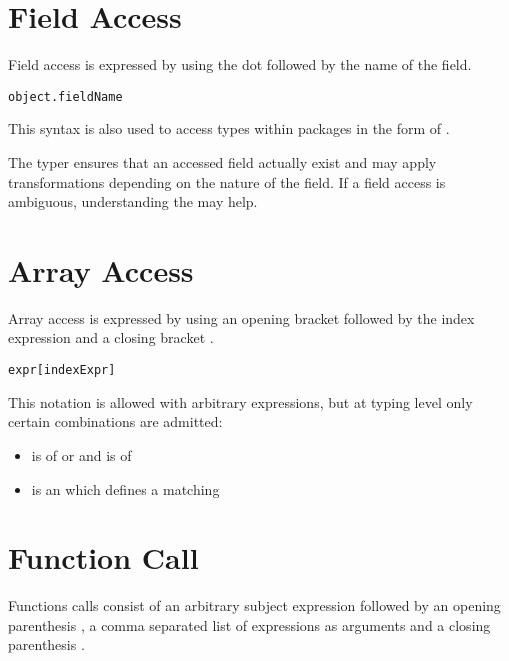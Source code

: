 \section{Field Access}
\label{expression-field-access}

Field access is expressed by using the dot  followed by the name of the field.

\begin{lstlisting}
object.fieldName
\end{lstlisting}

This syntax is also used to access types within packages in the form of .

The typer ensures that an accessed field actually exist and may apply transformations depending on the nature of the field. If a field access is ambiguous, understanding the  may help.


\section{Array Access}
\label{expression-array-access}

Array access is expressed by using an opening bracket \expr{[} followed by the index expression and a closing bracket \expr{]}.

\begin{lstlisting}
expr[indexExpr]
\end{lstlisting}

This notation is allowed with arbitrary expressions, but at typing level only certain combinations are admitted:

\begin{itemize}
	\item {} is of  or  and  is of 
	\item {} is an  which defines a matching 
\end{itemize}


\section{Function Call}
\label{expression-function-call}

Functions calls consist of an arbitrary subject expression followed by an opening parenthesis \expr{(}, a comma \expr{,} separated list of expressions as arguments and a closing parenthesis \expr{)}.


